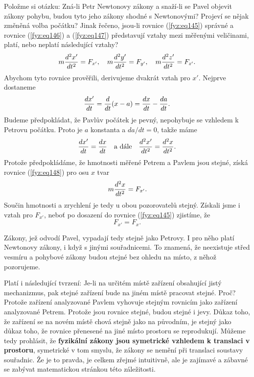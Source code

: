     Položme si otázku: Zná-li Petr Newtonovy zákony a snaží-li se Pavel objevit zákony pohybu, 
    budou tyto jeho zákony shodné s Newtonovými? Projeví se nějak změněná volba počátku? Jinak 
    řečeno, jsou-li rovnice (\ref{fyz:eq145}) správné a rovnice (\ref{fyz:eq146}) a 
    (\ref{fyz:eq147}) představují vztahy mezi měřenými veličinami, platí, nebo neplatí následující 
    vztahy?
    \begin{equation}\label{fyz:eq148}
      m\dfrac{d^2 x'}{d t^2} = F_{x'}, \quad
      m\dfrac{d^2 y'}{d t^2} = F_{y'}, \quad
      m\dfrac{d^2 z'}{d t^2} = F_{z'}.
    \end{equation}
    Abychom tyto rovnice prověřili, derivujeme dvakrát vztah pro \(x'\). Nejprve dostaneme
    \begin{equation*}
      \dfrac{d x'}{d t} =\dfrac{d  }{d t}(x-a) = \dfrac{d x}{d t} - \dfrac{d a}{d t}.
    \end{equation*}
    Budeme předpokládat, že Pavlův počátek je pevný, nepohybuje se vzhledem k Petrovu počátku. 
    Proto je \(a\) konstanta a \(da/dt=0\), takže máme
    \begin{equation*}
      \dfrac{d x'}{d t} = \dfrac{d x}{d t} \quad\text{a dále}\quad \dfrac{d^2 x'}{d t^2} = \dfrac{d^2 x}{d t^2}.
    \end{equation*}
    Protože předpokládáme, že hmotnosti měřené Petrem a Pavlem jsou stejné, získá rovnice 
    (\ref{fyz:eq148}) pro osu \(x\) tvar
    \begin{equation*}
      m\dfrac{d^2 x}{d t^2} = F_{x'}.
    \end{equation*}
    Součin hmotnosti a zrychlení je tedy u obou pozorovatelů stejný. Získali jsme i vztah pro 
    \(F_{x'}\), neboť po dosazení do rovnice (\ref{fyz:eq145}) zjistíme, že
    \begin{equation*}
      F_{x'} = F_{x}.
    \end{equation*}
    
    Zákony, jež odvodí Pavel, vypadají tedy stejně jako Petrovy. I pro něho platí Newtonovy zákony, 
    i když s jinými souřadnicemi. To znamená, že neexistuje střed vesmíru a pohybové zákony budou 
    stejné bez ohledu na místo, z něhož pozorujeme.
    
    Platí i následující tvrzení: Je-li na určitém místě zařízení obsahující jistý mechanizmus, pak
    stejné zařízení bude na jiném místě pracovat stejné. Proč? Protože zařízení analyzované Pavlem
    vyhovuje stejným rovnicím jako zařízení analyzované Petrem. Protože jsou rovnice stejné, budou
    stejné i jevy. Důkaz toho, že zařízení se na novém místě chová stejně jako na původním, je
    stejný jako důkaz toho, že rovnice přenesené na jiné místo prostoru se reprodukují. Můžeme tedy
    prohlásit, že \textbf{fyzikální zákony jsou symetrické vzhledem k translaci v prostoru},
    symetrické v tom smyslu, že zákony se nemění při translaci soustavy souřadnic. Že je to pravda,
    je celkem zřejmé intuitivně, ale je zajímavé a zábavné se zabývat matematickou stránkou této
    záležitosti.
    
